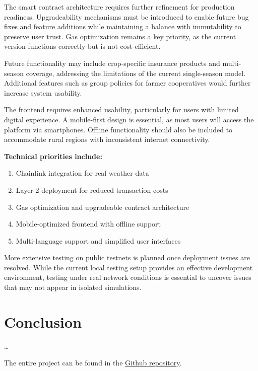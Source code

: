 \documentclass[11pt,a4paper]{article}
\begin{document}
		The smart contract architecture requires further refinement for production readiness. 
		Upgradeability mechanisms must be introduced to enable future bug fixes and feature additions while maintaining a balance with immutability to preserve user trust. 
		Gas optimization remains a key priority, as the current version functions correctly but is not cost-efficient. 

		Future functionality may include crop-specific insurance products and multi-season coverage, addressing the limitations of the current single-season model. 
		Additional features such as group policies for farmer cooperatives would further increase system usability. 

		The frontend requires enhanced usability, particularly for users with limited digital experience. 
		A mobile-first design is essential, as most users will access the platform via smartphones. 
		Offline functionality should also be included to accommodate rural regions with inconsistent internet connectivity. 

		\textbf{Technical priorities include:}

		\begin{enumerate}
			\item Chainlink integration for real weather data
			\item Layer 2 deployment for reduced transaction costs
			\item Gas optimization and upgradeable contract architecture
			\item Mobile-optimized frontend with offline support
			\item Multi-language support and simplified user interfaces
		\end{enumerate}

		More extensive testing on public testnets is planned once deployment issues are resolved. 
		While the current local testing setup provides an effective development environment, testing under real network conditions is essential to uncover issues that may not appear in isolated simulations.

		\section{Conclusion}\label{sec:conclusion}
		\ldots

		The entire project can be found in the \href{https://github.com/vincentschall/decentralized_weather_insurance}{Github repository}.

		\printbibliography
\end{document}
